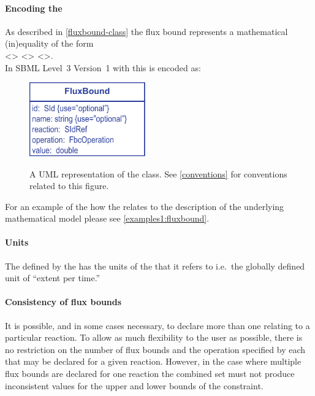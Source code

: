 \paragraph{Encoding the \FluxBound}
As described in \ref{fluxbound-class} the flux bound represents a
mathematical (in)equality of the form\\ <> <>
<>.\\ In SBML Level~3 Version~1 with \FBC this is encoded as:
%
%
%
\begin{figure}[h!]
  \centering
  \includegraphics[width=5cm]{images/fbc_uml_fbnd.pdf}\\
  \caption{A UML representation of the \FBCPackage \FluxBound class. See
  \ref{conventions} for conventions related to this figure.}
  \label{fig:fbc_uml_fbnd}
\end{figure}
%
For an example of the how the \FluxBound relates to the description of the underlying mathematical model please see \ref{examples1:fluxbound}.

\paragraph{Units}
The  defined by the \FluxBound has the units of the  that it refers to i.e.~the globally defined unit of ``extent per time.''

\paragraph{Consistency of flux bounds}

It is possible, and in some cases necessary, to declare more than one
\FluxBound relating to a particular reaction. To allow as much
flexibility to the user as possible, there is no restriction on the
number of flux bounds and the operation specified by each that may be
declared for a given reaction. However, in the case where multiple
flux bounds are declared for one reaction the combined set must not
produce inconsistent values for the upper and lower bounds of the
constraint.

